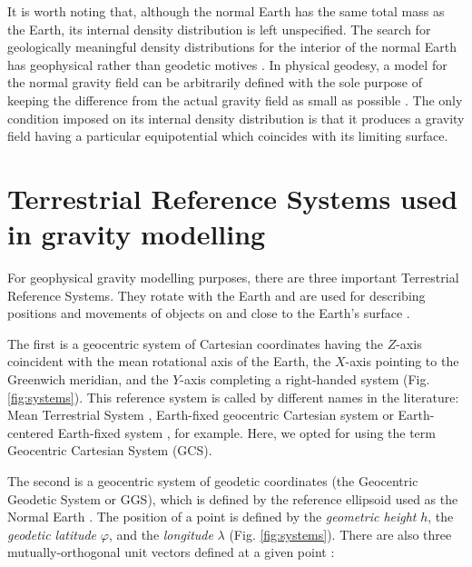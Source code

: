 \documentclass[extra]{gji}
\begin{document}
It is worth noting that, although the normal Earth has the same total mass as
the Earth, its internal density distribution is left unspecified.
The search for geologically meaningful density distributions
for the interior of the normal Earth has
geophysical rather than geodetic motives \citep{marussi1974}.
In physical geodesy, a model for the normal gravity field
can be arbitrarily defined with the sole purpose of
keeping the difference from the actual gravity field
as small as possible \citep{vanicek1987}.
The only condition imposed on its internal density
distribution is that it produces a gravity field
having a particular equipotential which coincides
with its limiting surface.


\section{Terrestrial Reference Systems used in gravity modelling}

For geophysical gravity modelling purposes, there are three important
Terrestrial Reference Systems.
They rotate with the Earth and are used for describing
positions and movements of objects on and close to the Earth's surface
\citep{torge2012}.

The first is a geocentric system of Cartesian coordinates
having the $Z$-axis coincident with the mean rotational axis of the Earth,
the $X$-axis pointing to the Greenwich meridian,
and the $Y$-axis completing a right-handed system (Fig. \ref{fig:systems}).
This reference system is called by different names in the literature:
Mean Terrestrial System \citep[e.g.,][]{soler1976},
Earth-fixed geocentric Cartesian system \citep[e.g.,][]{torge2012}
or Earth-centered Earth-fixed system \citep[e.g.,][]{bouman_etal2013},
for example.
Here, we opted for using the term Geocentric Cartesian System (GCS).

The second is a geocentric system of geodetic coordinates
(the Geocentric Geodetic System or GGS),
which is defined by the reference ellipsoid used as the Normal Earth
\citep{heiskanen-moritz1967, soler1976, torge2012, bouman_etal2013}.
The position of a point is defined by
the \textit{geometric height} $h$,
the \textit{geodetic latitude} $\varphi$,
and the \textit{longitude} $\lambda$ (Fig. \ref{fig:systems}).
There are also three mutually-orthogonal unit vectors defined at a given point
\citep{soler1976}:
\end{document}
